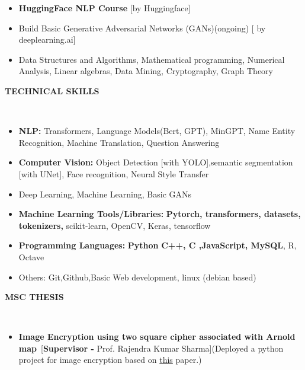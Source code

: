 \documentclass[a4paper,10pt]{article}
\newcommand{\lsep}{-0.5cm}
\newcommand{\resheading}[1]{{\small \colorbox{mygrey}{\begin{minipage}{0.975\textwidth}{\textbf{#1 \vphantom{p\^{E}}}}\end{minipage}}}}
\begin{document}
\begin{itemize}
\item \textbf{HuggingFace NLP Course} [by Huggingface]

\item Build Basic Generative Adversarial Networks (GANs)(ongoing) [ by deeplearning.ai]



\item Data Structures and Algorithms, Mathematical programming, Numerical Analysis, Linear algebras, Data Mining, Cryptography, Graph Theory
\end{itemize}

\resheading{\textbf{TECHNICAL SKILLS} }\\[\lsep]
\begin{itemize}
\setlength\itemsep{0em}

\item \textbf{NLP:} Transformers, Language Models(Bert, GPT), MinGPT, Name Entity Recognition, Machine Translation, Question Answering 

\item \textbf{Computer Vision:} Object Detection [with YOLO],semantic segmentation [with UNet], Face recognition, Neural Style Transfer

\item Deep Learning, Machine Learning, Basic GANs

\item \textbf{Machine Learning Tools/Libraries: } \textbf{Pytorch, transformers, datasets, tokenizers,} scikit-learn, OpenCV, Keras, tensorflow


\item \textbf{Programming Languages: } \textbf{Python}
\textbf{C++, C ,JavaScript, MySQL}, R, Octave

\item Others: Git,Github,Basic Web development, linux (debian based)
\end{itemize}

\resheading{\textbf{MSC THESIS} }\\[\lsep]
\begin{itemize}
\setlength\itemsep{0.5em}
\item \textbf{Image Encryption using two square cipher associated with Arnold map}\ [\textbf{Supervisor - }Prof. Rajendra Kumar Sharma](Deployed a python project for image encryption based on \href{https://web.iitd.ac.in/~rksharma/Research%20Publications/Journal/dc-optic.pdf}{this} paper.)
\end{itemize}
\end{document}

